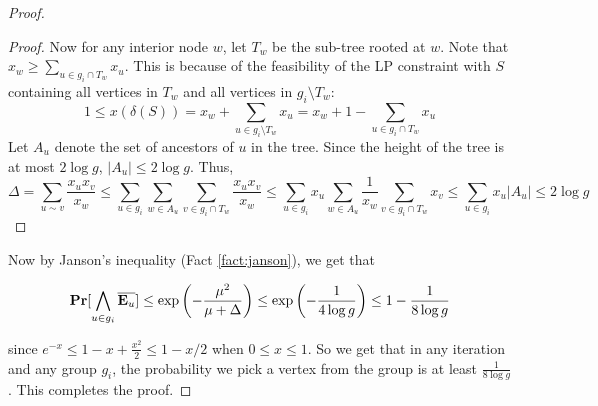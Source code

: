 \documentclass[11pt]{article}
\def\bar{\overline}
\begin{document}
\begin{proof}
\begin{proof}
Now for any interior node $w$, let $T_w$ be the sub-tree rooted at $w$.
Note that $x_w \ge \sum_{u\in g_i\cap T_w} x_u$. This is because of the feasibility of the LP constraint with 
$S$ containing all vertices in $T_w$ and all vertices in $g_i\setminus T_w$: $$1 \le x(\delta(S)) = x_w + \sum_{u\in g_i\setminus T_w}x_u = x_w + 1 - \sum_{u\in g_i\cap T_w} x_u$$
\noindent
Let $A_u$ denote the set of ancestors of $u$ in the tree. Since the height of the tree is at most $2\log g$, 
$|A_u| \le 2\log g$.
Thus, 
$$\Delta = \sum_{u\sim v} \frac{x_ux_v}{x_w} \le \sum_{u\in g_i} \sum_{w\in A_u} \sum_{v\in g_i\cap T_w} \frac{x_ux_v}{x_w}  \le \sum_{u\in g_i} x_u \sum_{w\in A_u} \frac{1}{x_w} \sum_{v\in g_i\cap T_w} x_v \le \sum_{u\in g_i} x_u |A_u| \le 2\log g$$
\end{proof}

\noindent
Now by Janson's inequality (Fact \ref{fact:janson}), we get that

$$\Pr[\bigwedge_{u\in g_i} \bar{\E_u}] \le \exp\left( - \frac{\mu^2}{\mu + \Delta} \right) \le \exp\left(-\frac{1}{4\log g}\right) \le 1 - \frac{1}{8\log g}$$

\noindent
since $e^{-x} \le 1 - x + \frac{x^2}{2} \le 1 - x/2$ when $0 \le x\le 1$. So we get that in any iteration and any group $g_i$, the probability we pick a vertex from the group is at least $\frac{1}{8\log g}$. This completes the proof.
\end{proof}
 
 
\newpage
\def\E{{\bf E}}
\appendix
\end{document}
